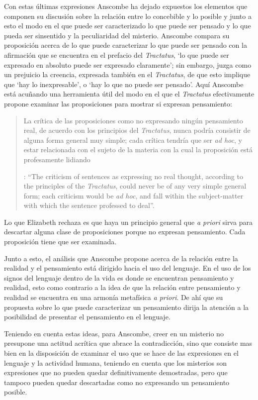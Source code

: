Con estas últimas expresiones Anscombe ha dejado expuestos los elementos que componen su discusión sobre la relación entre lo concebible y lo posible y junto a esto el modo en el que puede ser caracterizado lo que puede ser pensado y lo que pueda ser sinsentido y la peculiaridad del misterio. Anscombe compara su proposición acerca de lo que puede caracterizar lo que puede ser pensado con la afirmación que se encuentra en el prefacio del \emph{Tractatus}, \enquote*{lo que puede ser expresado en absoluto puede ser expresado claramente}; sin embargo, juzga como un prejuicio la creencia, expresada también en el \emph{Tractatus}, de que esto implique que \enquote*{hay lo inexpresable}, o \enquote*{hay lo que no puede ser pensado}. Aquí Anscombe está acuñando una herramienta útil del modo en el que el \emph{Tractatus} efectivamente propone examinar las proposiciones para mostrar si expresan pensamiento: \blockquote[{\Cite[151]{anscombe1959iwt}}: \enquote{The criticism of sentences as expressing no real thought, according to the principles of the \emph{Tractatus}, could never be of any very simple general form; each criticism would be \emph{ad hoc}, and fall within the subject-matter with which the sentence professed to deal}.]{La crítica de las proposiciones como no expresando ningún pensamiento real, de acuerdo con los principios del \emph{Tractatus}, nunca podría consistir de alguna forma general muy simple; cada crítica tendría que ser \emph{ad hoc}, y estar relacionada con el sujeto de la materia con la cual la proposición está profesamente lidiando}. Lo que Elizabeth rechaza es que haya un principio general que \emph{a priori} sirva para descartar alguna clase de proposiciones porque no expresan pensamiento. Cada proposición tiene que ser examinada.

Junto a esto, el análisis que Anscombe propone acerca de la relación entre la realidad y el pensamiento está dirigido hacia el uso del lenguaje. En el uso de los signos del lenguaje dentro de la vida es donde se encuentran pensamiento y realidad, esto como contrario a la idea de que la relación entre pensamiento y realidad se encuentra en una armonía metafísica \emph{a priori}. De ahí que su propuesta sobre lo que puede caracterizar un pensamiento dirija la atención a la posibilidad de presentar el pensamiento en el lenguaje.

Teniendo en cuenta estas ideas, para Anscombe, creer en un misterio no presupone una actitud acrítica que abrace la contradicción, sino que consiste mas bien en la disposición de examinar el uso que se hace de las expresiones en el lenguaje y la actividad humana, teniendo en cuenta que los misterios son expresiones que no pueden quedar definitivamente demostradas, pero que tampoco pueden quedar descartadas como no expresando un pensamiento posible.

